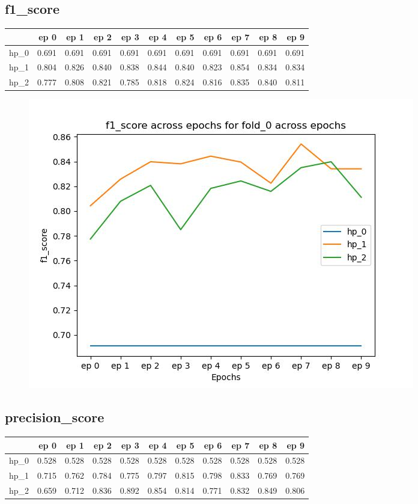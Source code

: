 \documentclass{article}
\begin{document}
\subsection{f1\_score}
\begin{tabular}{lrrrrrrrrrr}
\toprule
{} &   ep 0 &   ep 1 &   ep 2 &   ep 3 &   ep 4 &   ep 5 &   ep 6 &   ep 7 &   ep 8 &   ep 9 \\
\midrule
hp\_0 &  0.691 &  0.691 &  0.691 &  0.691 &  0.691 &  0.691 &  0.691 &  0.691 &  0.691 &  0.691 \\
hp\_1 &  0.804 &  0.826 &  0.840 &  0.838 &  0.844 &  0.840 &  0.823 &  0.854 &  0.834 &  0.834 \\
hp\_2 &  0.777 &  0.808 &  0.821 &  0.785 &  0.818 &  0.824 &  0.816 &  0.835 &  0.840 &  0.811 \\
\bottomrule
\end{tabular}

\begin{figure}[H]
\includegraphics[scale = 0.75]{fold_0/f1_score}
\end{figure}
\subsection{precision\_score}
\begin{tabular}{lrrrrrrrrrr}
\toprule
{} &   ep 0 &   ep 1 &   ep 2 &   ep 3 &   ep 4 &   ep 5 &   ep 6 &   ep 7 &   ep 8 &   ep 9 \\
\midrule
hp\_0 &  0.528 &  0.528 &  0.528 &  0.528 &  0.528 &  0.528 &  0.528 &  0.528 &  0.528 &  0.528 \\
hp\_1 &  0.715 &  0.762 &  0.784 &  0.775 &  0.797 &  0.815 &  0.798 &  0.833 &  0.769 &  0.769 \\
hp\_2 &  0.659 &  0.712 &  0.836 &  0.892 &  0.854 &  0.814 &  0.771 &  0.832 &  0.849 &  0.806 \\
\bottomrule
\end{tabular}
\end{document}
